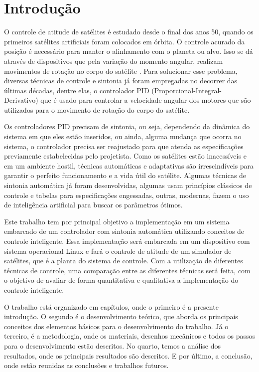 \chapter[Introdução]{Introdução}

O controle de atitude de satélites é estudado desde o final dos anos 50, quando os primeiros satélites artificiais foram colocados em órbita. O controle acurado da posição é necessário para manter o alinhamento com o planeta ou alvo. Isso se dá através de dispositivos que pela variação do momento angular, realizam movimentos de rotação no corpo do satélite . Para solucionar esse problema, diversas técnicas de controle e sintonia já foram empregadas no decorrer das últimas décadas, dentre elas, o controlador PID (Proporcional-Integral-Derivativo) que é usado para controlar a velocidade angular dos motores que são utilizados para o movimento de rotação do corpo do satélite.

Os controladores PID precisam de sintonia, ou seja, dependendo da dinâmica do sistema em que eles estão inseridos, ou ainda, alguma mudança que ocorra no sistema, o controlador precisa ser reajustado para que atenda as especificações previamente estabelecidas pelo projetista. Como os satélites estão inacessíveis e em um ambiente hostil, técnicas automáticas e adaptativas são irrescindíveis para garantir o perfeito funcionamento e a vida útil do satélite. Algumas técnicas de sintonia automática já foram desenvolvidas, algumas usam princípios clássicos de controle e tabelas para especificações engessadas, outras, modernas, fazem o uso de inteligência artificial para buscar os parâmetros ótimos.


Este trabalho tem por principal objetivo a implementação em um sistema embarcado de um controlador com sintonia automática utilizando conceitos de controle inteligente. Essa implementação será embarcada em um dispositivo com sistema operacional Linux e fará o controle de atitude de um simulador de satélites, que é a planta do sistema de controle. Com a utilização de diferentes técnicas de controle, uma comparação entre as diferentes técnicas será feita, com o objetivo de avaliar de forma quantitativa e qualitativa a implementação do controle inteligente.

O trabalho está organizado em capítulos, onde o primeiro é a presente introdução. O segundo é o desenvolvimento teórico, que aborda os principais conceitos dos elementos básicos para o desenvolvimento do trabalho. Já o terceiro, é a metodologia, onde os materiais, desenhos mecânicos e todos os passos para o desenvolvimento estão descritos. No quarto, temos a análise dos resultados, onde os principais resultados são descritos. E por último, a conclusão, onde estão reunidas as conclusões e trabalhos futuros.











